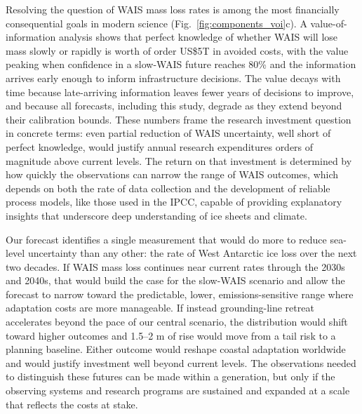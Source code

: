 \documentclass[12pt]{article}
\begin{document}
Resolving the question of WAIS mass loss rates is among the most financially consequential goals in modern science (Fig.~\ref{fig:components_voi}c). A value-of-information analysis shows that perfect knowledge of whether WAIS will lose mass slowly or rapidly is worth of order US\$5T in avoided costs, with the value peaking when confidence in a slow-WAIS future reaches 80\% and the information arrives early enough to inform infrastructure decisions. The value decays with time because late-arriving information leaves fewer years of decisions to improve, and because all forecasts, including this study, degrade as they extend beyond their calibration bounds. These numbers frame the research investment question in concrete terms: even partial reduction of WAIS uncertainty, well short of perfect knowledge, would justify annual research expenditures orders of magnitude above current levels. The return on that investment is determined by how quickly the observations can narrow the range of WAIS outcomes, which depends on both the rate of data collection and the development of reliable process models, like those used in the IPCC, capable of providing explanatory insights that underscore deep understanding of ice sheets and climate. 

Our forecast identifies a single measurement that would do more to reduce sea-level uncertainty than any other: the rate of West Antarctic ice loss over the next two decades. If WAIS mass loss continues near current rates through the 2030s and 2040s, that would build the case for the slow-WAIS scenario and allow the forecast to narrow toward the predictable, lower, emissions-sensitive range where adaptation costs are more manageable. If instead grounding-line retreat accelerates beyond the pace of our central scenario, the distribution would shift toward higher outcomes and 1.5--2 m of rise would move from a tail risk to a planning baseline. Either outcome would reshape coastal adaptation worldwide and would justify investment well beyond current levels. The observations needed to distinguish these futures can be made within a generation, but only if the observing systems and research programs are sustained and expanded at a scale that reflects the costs at stake.
\end{document}
